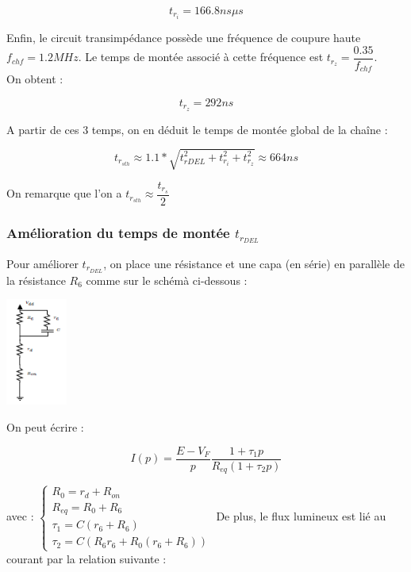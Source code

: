 \documentclass[a4paper]{report}
\begin{document}
$$t_{r_{i}} = 166.8 ns \mu s$$

Enfin, le circuit transimpédance possède une fréquence de coupure haute $f_{chf} = 1.2MHz$. Le temps de montée associé à cette fréquence est $t_{r_{z}} = \dfrac{0.35}{f_{chf}}$.\\

On obtent :

$$t_{r_{z}} = 292ns$$

A partir de ces 3 temps, on en déduit le temps de montée global de la chaîne :

$$t_{r_{sth}} \approx 1.1*\sqrt{t_{rDEL}^2 + t_{r_{i}}^2 + t_{r_{z}}^2} \approx 664ns$$

On remarque que l'on a $t_{r_{sth}} \approx \dfrac{t_{r_{s}}}{2}$

\subsubsection{Amélioration du temps de montée $t_{r_{DEL}}$}

Pour améliorer $t_{r_{DEL}}$, on place une résistance et une capa (en série) en parallèle de la résistance $R_6$ comme sur le schémà ci-dessous :

\begin{center}
\includegraphics[width=0.15\textwidth]{montage_amelio_trdel.PNG}
\end{center}

On peut écrire :

$$I(p) = \dfrac{E-V_F}{p}\dfrac{1+\tau_1p}{R_{eq}(1+\tau_2p)}$$

avec :
\newline
\newline
$\left\{
\begin{array}{l}
  R_0 = r_d + R_{on}\\
  R_{eq} = R_0 + R_6\\
  \tau_1 = C(r_6+R_6)\\
  \tau_2 = C(R_6r_6 + R_0(r_6+R_6))
\end{array}
\right.$
\newline
\newline
De plus, le flux lumineux est lié au courant par la relation suivante : 
\end{document}
